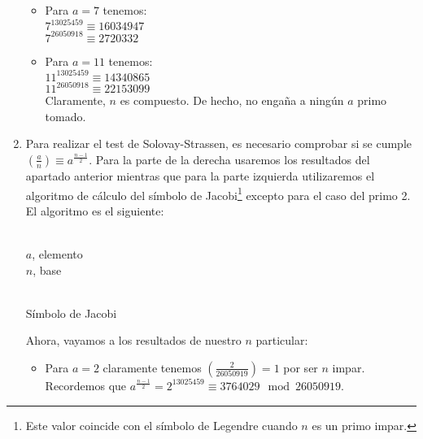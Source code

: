 \begin{enumerate}
\begin{itemize}
			\item Para $a = 7$ tenemos:\\
				$7^{13025459} \equiv 16034947$\\
				$7^{26050918} \equiv 2720332$\\
				
			\item Para $a = 11$ tenemos:\\
				$11^{13025459} \equiv 14340865$\\
				$11^{26050918} \equiv 22153099$\\
				
			Claramente, $n$ es compuesto. De hecho, no engaña a ningún $a$ primo tomado.
		\end{itemize}
		
		\item Para realizar el test de Solovay-Strassen, es necesario comprobar si se cumple $\displaystyle \left(
		\frac{a}{n} \right) \equiv a^{\frac{n-1}{2}}$. Para la parte de la derecha usaremos los resultados del
		apartado anterior mientras que para la parte izquierda utilizaremos el algoritmo de cálculo del símbolo
		de Jacobi\footnote{Este valor coincide con el símbolo de Legendre cuando $n$ es un primo impar.} excepto
		para el caso del primo 2. El algoritmo es el siguiente:
		\begin{algorithm}[H]
			\begin{algorithmic}[1]
				\REQUIRE \ \\
					\texttt{$a$}, elemento \\
					\texttt{$n$}, base \\ \
						\ENDIF
					\ENDWHILE
					\ENDIF
				\ENDWHILE
				\ELSE
				\ENDIF
			\end{algorithmic}
			\caption{Símbolo de Jacobi}
			\label{Jac-symbol}
		\end{algorithm}
		
		Ahora, vayamos a los resultados de nuestro $n$ particular:
		
		\begin{itemize}
			\item Para $a = 2$ claramente tenemos $\displaystyle \left(\frac{2}{26050919} \right) = 1$ por ser
			$n$ impar. Recordemos que $ a^{\frac{n-1}{2}} = 2^{13025459} \equiv 3764029 \mod 26050919$.
			

\end{itemize}
\end{enumerate}
